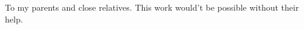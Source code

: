 \documentclass[twoside]{report}
\theoremstyle{definition}
\theoremstyle{remark}
\theoremstyle{remark}
\newcommand{\dedication}[1]
   {\thispagestyle{empty}

   \begin{flushleft}\raggedleft #1\end{flushleft}
}
\begin{document}
\sloppy



\newpage
\dedication{To my parents and close relatives. This work would't be possible without their help.}
\newpage
\setcounter{page}{5}

\newpage
\thispagestyle{empty}
\mbox{}
\newpage

\tableofcontents
\listoftables
\listoffigures

\newpage












\end{document}
